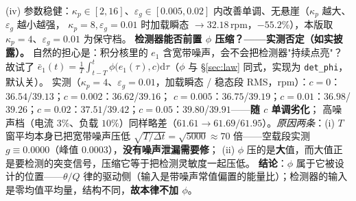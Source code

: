 \documentclass[11pt]{article}
\theoremstyle{remark}\newtheorem{remark}{注}
\begin{document}
(iv) 参数稳健：$\kappa_p\in[2,16]$、$\varepsilon_g\in[0.005,0.02]$ 内改善单调、无悬崖（$\kappa_p$ 越大、$\varepsilon_g$ 越小越强，
$\kappa_p=8,\varepsilon_g=0.01$ 时加载瞬态 $\to32.18$\,rpm，$-55.2\%$），本版取 $\kappa_p=4$、$\varepsilon_g=0.01$ 为保守档。
\vspace{1mm}
\noindent\textbf{检测器能否前置 $\phi$ 压缩？——实测否定（如实披露）。} 自然的担心是：积分核里的 $e_1$ 含宽带噪声，会不会把检测器"持续点亮"？
故试了 $\bar e_1(t)=\frac1T\int_{t-T}^{t}\phi\big(e_1(\tau),c\big)\mathrm d\tau$（$\phi$ 与 §\ref{sec:law} 同式，实现为 \texttt{det\_phi}，默认关）。
实测（$\kappa_p=4$、$\varepsilon_g=0.01$，加载瞬态 / 稳态段 RMS，rpm）：$c=0$：$36.54$/$39.13$；$c=0.002$：$36.62$/$39.16$；
$c=0.005$：$36.75$/$39.19$；$c=0.01$：$36.98$/$39.26$；$c=0.02$：$37.51$/$39.42$；$c=0.05$：$39.80$/$39.91$——\textbf{随 $c$ 单调劣化}；
高噪声档（电流 $3\%$、负载 $10\%$）同样略差（$61.61\to61.69/61.95$）。\emph{原因两条}：(i) $T$ 窗平均本身已把宽带噪声压低
$\sqrt{T/\Delta t}=\sqrt{5000}\approx70$ 倍——空载段实测 $g\equiv0.0000$（峰值 $0.0003$），\textbf{没有噪声泄漏需要修}；
(ii) $\phi$ 压的是\textbf{大}值，而大值正是要检测的突变信号，压缩它等于把检测灵敏度一起压低。
\textbf{结论}：$\phi$ 属于它被设计的位置——$\theta/Q$ 律的驱动侧（输入是带噪声常值偏置的能量比）；检测器的输入是零均值平均量，结构不同，\textbf{故本律不加 $\phi$}。
\end{document}
